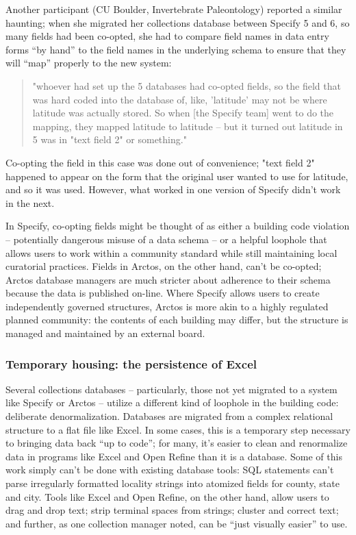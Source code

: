 Another participant (CU Boulder, Invertebrate Paleontology) reported a similar haunting; when she migrated her collections database between Specify 5 and 6, so many fields had been co-opted, she had to compare field names in data entry forms “by hand” to the field names in the underlying schema to ensure that they will “map” properly to the new system: 
\begin{quote}
"whoever had set up the 5 databases had co-opted fields, so the field that was hard coded into the database of, like, 'latitude' may not be where latitude was actually stored. So when [the Specify team] went to do the mapping, they mapped latitude to latitude -- but it turned out latitude in 5 was in "text field 2" or something." 
\end{quote}
Co-opting the field in this case was done out of convenience; "text field 2" happened to appear on the form that the original user wanted to use for latitude, and so it was used. However, what worked in one version of Specify didn't work in the next.

In Specify, co-opting fields might be thought of as either a building code violation -- potentially dangerous misuse of a data schema -- or a helpful loophole that allows users to work within a community standard while still maintaining local curatorial practices. Fields in Arctos, on the other hand, can't be co-opted; Arctos database managers are much stricter about adherence to their schema because the data is published on-line. Where Specify allows users to create independently governed structures, Arctos is more akin to a highly regulated planned community: the contents of each building may differ, but the structure is managed and maintained by an external board.

\subsubsection{Temporary housing: the persistence of Excel}

Several collections databases -- particularly, those not yet migrated to a system like Specify or Arctos -- utilize a different kind of loophole in the building code: deliberate denormalization. Databases are migrated from a complex relational structure to a flat file like Excel. In some cases, this is a temporary step necessary to bringing data back “up to code”; for many, it's easier to clean and renormalize data in programs like Excel and Open Refine than it is a database. Some of this work simply can’t be done with existing database tools: SQL statements can’t parse irregularly formatted locality strings into atomized fields for county, state and city. Tools like Excel and Open Refine, on the other hand, allow users to drag and drop text; strip terminal spaces from strings; cluster and correct text; and further, as one collection manager noted, can be “just visually easier” to use.

